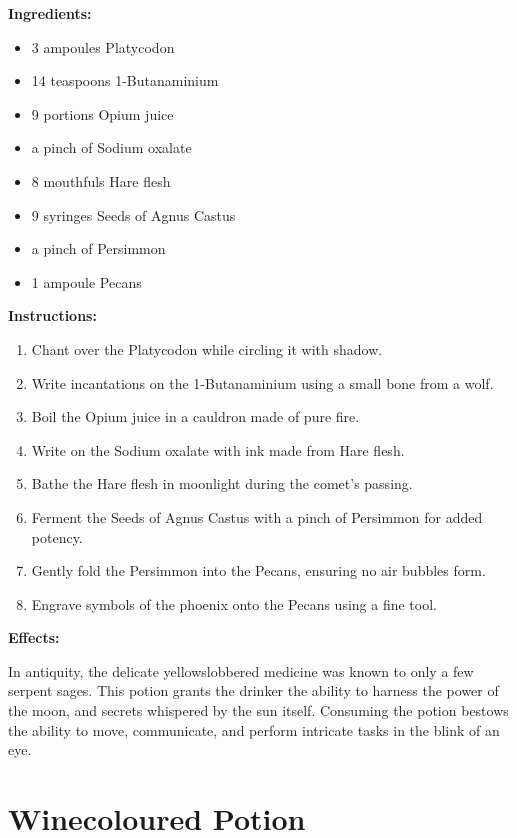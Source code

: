 \documentclass{article}
\begin{document}
\textbf{Ingredients:}

\begin{itemize}
  \item 3 ampoules Platycodon
  \item 14 teaspoons 1-Butanaminium
  \item 9 portions Opium juice
  \item a pinch of Sodium oxalate
  \item 8 mouthfuls Hare flesh
  \item 9 syringes Seeds of Agnus Castus
  \item a pinch of Persimmon
  \item 1 ampoule Pecans
\end{itemize}

\textbf{Instructions:}

\begin{enumerate}
  \item Chant over the Platycodon while circling it with shadow.
  \item Write incantations on the 1-Butanaminium using a small bone from a wolf.
  \item Boil the Opium juice in a cauldron made of pure fire.
  \item Write on the Sodium oxalate with ink made from Hare flesh.
  \item Bathe the Hare flesh in moonlight during the comet’s passing.
  \item Ferment the Seeds of Agnus Castus with a pinch of Persimmon for added potency.
  \item Gently fold the Persimmon into the Pecans, ensuring no air bubbles form.
  \item Engrave symbols of the phoenix onto the Pecans using a fine tool.
\end{enumerate}

\textbf{Effects:}

In antiquity, the delicate yellowslobbered medicine was known to only a few serpent sages. This potion grants the drinker the ability to harness the power of the moon, and secrets whispered by the sun itself. Consuming the potion bestows the ability to move, communicate, and perform intricate tasks in the blink of an eye.

\newpage
\section*{Winecoloured Potion}
\end{document}
